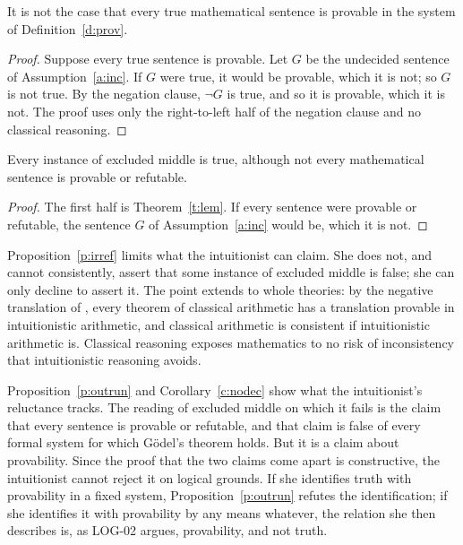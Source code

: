\documentclass{situationist-preprint}
\begin{document}
\begin{proposition}\label{p:outrun}
It is not the case that every true mathematical sentence is provable in the system of Definition~\ref{d:prov}.
\end{proposition}

\begin{proof}
Suppose every true sentence is provable. Let $G$ be the undecided sentence of Assumption~\ref{a:inc}. If $G$ were true, it would be provable, which it is not; so $G$ is not true. By the negation clause, $\neg G$ is true, and so it is provable, which it is not. The proof uses only the right-to-left half of the negation clause and no classical reasoning.
\end{proof}

\begin{corollary}\label{c:nodec}
Every instance of excluded middle is true, although not every mathematical sentence is provable or refutable.
\end{corollary}

\begin{proof}
The first half is Theorem~\ref{t:lem}. If every sentence were provable or refutable, the sentence $G$ of Assumption~\ref{a:inc} would be, which it is not.
\end{proof}

Proposition~\ref{p:irref} limits what the intuitionist can claim. She does not, and cannot consistently, assert that some instance of excluded middle is false; she can only decline to assert it. The point extends to whole theories: by the negative translation of \citet{Goedel1933}, every theorem of classical arithmetic has a translation provable in intuitionistic arithmetic, and classical arithmetic is consistent if intuitionistic arithmetic is. Classical reasoning exposes mathematics to no risk of inconsistency that intuitionistic reasoning avoids.

Proposition~\ref{p:outrun} and Corollary~\ref{c:nodec} show what the intuitionist's reluctance tracks. The reading of excluded middle on which it fails is the claim that every sentence is provable or refutable, and that claim is false of every formal system for which Gödel's theorem holds. But it is a claim about provability. Since the proof that the two claims come apart is constructive, the intuitionist cannot reject it on logical grounds. If she identifies truth with provability in a fixed system, Proposition~\ref{p:outrun} refutes the identification; if she identifies it with provability by any means whatever, the relation she then describes is, as LOG-02 argues, provability, and not truth.
\end{document}
